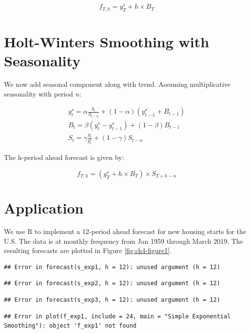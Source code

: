 \documentclass[]{book}
\theoremstyle{definition}
\theoremstyle{definition}
\theoremstyle{definition}
\theoremstyle{remark}
\begin{document}
\begin{align}
  f_{T,h} = y_T^s + h\times B_T
  \end{align}

\hypertarget{holt-winters-smoothing-with-seasonality}{%
\section{Holt-Winters Smoothing with Seasonality}\label{holt-winters-smoothing-with-seasonality}}

We now add seasonal component along with trend. Assuming multiplicative seasonality with period \(n\):

\begin{align}
    y_{t}^{s}= \alpha \frac{y_t}{S_{t-n}} + (1-\alpha)(y_{t-1}^{s}+B_{t-1})\\
    B_t = \beta (y_t^s -y_{t-1}^s) + (1-\beta) B_{t-1}\\
    S_t = \gamma\frac{y_t}{y_t^s}+(1-\gamma)S_{t-n}
  \end{align}

The h-period ahead forecast is given by:

\begin{equation}
    f_{T,h}= (y_T^s + h\times B_T) \times S_{T+h-n}
   \end{equation}

\hypertarget{application}{%
\section{Application}\label{application}}

We use R to implement a 12-period ahead forecast for new housing starts for the U.S. The data is at monthly frequency from Jan 1959 through March 2019. The resulting forecasts are plotted in Figure \ref{fig:ch4-figure1}.

\begin{verbatim}
## Error in forecast(s_exp1, h = 12): unused argument (h = 12)
\end{verbatim}

\begin{verbatim}
## Error in forecast(s_exp2, h = 12): unused argument (h = 12)
\end{verbatim}

\begin{verbatim}
## Error in forecast(s_exp3, h = 12): unused argument (h = 12)
\end{verbatim}

\begin{verbatim}
## Error in plot(f_exp1, include = 24, main = "Simple Exponential Smoothing"): object 'f_exp1' not found
\end{verbatim}
\end{document}

